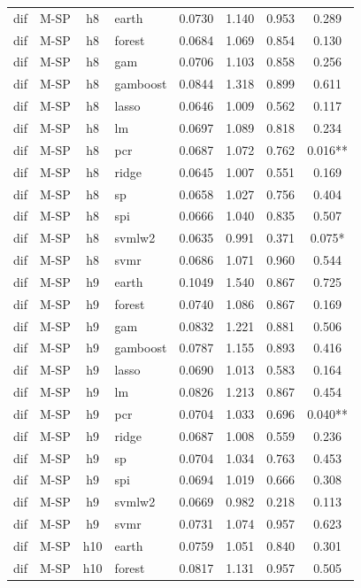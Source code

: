 \begin{ThreePartTable}
\begin{longtable}[t]{llclcccc}
\addlinespace
dif & M-SP & h8 & earth & 0.0730 & 1.140 & 0.953 & 0.289\\
dif & M-SP & h8 & forest & 0.0684 & 1.069 & 0.854 & 0.130\\
dif & M-SP & h8 & gam & 0.0706 & 1.103 & 0.858 & 0.256\\
dif & M-SP & h8 & gamboost & 0.0844 & 1.318 & 0.899 & 0.611\\
dif & M-SP & h8 & lasso & 0.0646 & 1.009 & 0.562 & 0.117\\
dif & M-SP & h8 & lm & 0.0697 & 1.089 & 0.818 & 0.234\\
dif & M-SP & h8 & pcr & 0.0687 & 1.072 & 0.762 & 0.016**\\
dif & M-SP & h8 & ridge & 0.0645 & 1.007 & 0.551 & 0.169\\
dif & M-SP & h8 & sp & 0.0658 & 1.027 & 0.756 & 0.404\\
dif & M-SP & h8 & spi & 0.0666 & 1.040 & 0.835 & 0.507\\
dif & M-SP & h8 & svmlw2 & 0.0635 & 0.991 & 0.371 & 0.075*\\
dif & M-SP & h8 & svmr & 0.0686 & 1.071 & 0.960 & 0.544\\
\addlinespace
dif & M-SP & h9 & earth & 0.1049 & 1.540 & 0.867 & 0.725\\
dif & M-SP & h9 & forest & 0.0740 & 1.086 & 0.867 & 0.169\\
dif & M-SP & h9 & gam & 0.0832 & 1.221 & 0.881 & 0.506\\
dif & M-SP & h9 & gamboost & 0.0787 & 1.155 & 0.893 & 0.416\\
dif & M-SP & h9 & lasso & 0.0690 & 1.013 & 0.583 & 0.164\\
dif & M-SP & h9 & lm & 0.0826 & 1.213 & 0.867 & 0.454\\
dif & M-SP & h9 & pcr & 0.0704 & 1.033 & 0.696 & 0.040**\\
dif & M-SP & h9 & ridge & 0.0687 & 1.008 & 0.559 & 0.236\\
dif & M-SP & h9 & sp & 0.0704 & 1.034 & 0.763 & 0.453\\
dif & M-SP & h9 & spi & 0.0694 & 1.019 & 0.666 & 0.308\\
dif & M-SP & h9 & svmlw2 & 0.0669 & 0.982 & 0.218 & 0.113\\
dif & M-SP & h9 & svmr & 0.0731 & 1.074 & 0.957 & 0.623\\
\addlinespace
dif & M-SP & h10 & earth & 0.0759 & 1.051 & 0.840 & 0.301\\
dif & M-SP & h10 & forest & 0.0817 & 1.131 & 0.957 & 0.505\\

\end{longtable}
\end{ThreePartTable}
